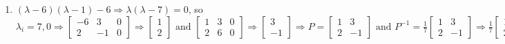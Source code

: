 \documentclass[12pt]{article}
\begin{document}
\begin{enumerate}
  \item $(\lambda-6)(\lambda-1)-6\Rightarrow \lambda(\lambda-7)=0$, so $\lambda_i=7,0\Rightarrow \left[ \begin{array}{cc|c} -6 & 3 & 0\\ 2 & -1 & 0  \end{array} \right]\Rightarrow \begin{bmatrix} 1\\2\end{bmatrix}\text{ and } \left[ \begin{array}{cc|c} 1 & 3 & 0\\ 2 & 6 & 0\end{array} \right]\Rightarrow\begin{bmatrix} 3\\-1\end{bmatrix}\Rightarrow P = \begin{bmatrix} 1 & 3\\2 & -1  \end{bmatrix}\text{ and } P^{-1}=\frac{1}{7}\begin{bmatrix}1 & 3\\ 2 & -1\end{bmatrix}\Rightarrow\frac{1}{7}\begin{bmatrix} 1 & 3\\ 2 & -1\end{bmatrix} \begin{bmatrix} 6 & -3\\ -2 & 1\end{bmatrix}\begin{bmatrix} 1 & 3\\ 2 & -1\end{bmatrix}=\begin{bmatrix} 0 & 0\\ 2 & -1\end{bmatrix}\begin{bmatrix} 1 & 3\\ 2 & -1\end{bmatrix}=\begin{bmatrix} 0 & 0\\ 0 & 7 \end{bmatrix}$ \textcolor{green}{\checkmark}

    \setcounter{enumi}{10}


\end{enumerate}
\end{document}
